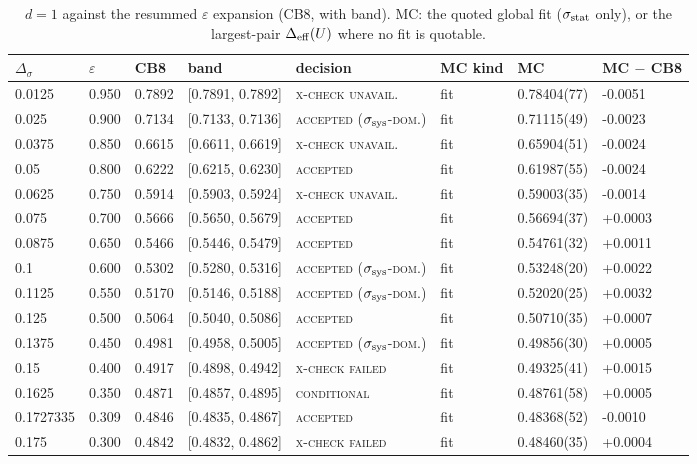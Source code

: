 \documentclass[10pt,a4paper]{article}
\newcommand{\Ds}{\Delta_\sigma}
\newcommand{\Deff}{\Delta_{\rm eff}}
\newcommand{\lbl}[1]{{\mdseries\scshape #1}}
\newcommand{\sstat}{\sigma_{\rm stat}}
\begin{document}
\begin{table}[htbp]\centering\scriptsize
\caption{$d=1$ against the resummed $\varepsilon$ expansion (CB8, with band). MC: the quoted global fit ($\sstat$ only), or the largest-pair
$\Deff(U)$ where no fit is quotable.}\label{tab:theory1d}
\begin{tabular}{@{}llllllll@{}}\toprule
$\Ds$ & $\varepsilon$ & CB8 & band & decision & MC kind & MC & MC $-$ CB8 \\\midrule
0.0125 & 0.950 & 0.7892 & [0.7891, 0.7892] & \lbl{x-check unavail.} & fit & 0.78404(77) & -0.0051 \\
0.025 & 0.900 & 0.7134 & [0.7133, 0.7136] & \lbl{accepted ($\sigma_{\rm sys}$-dom.)} & fit & 0.71115(49) & -0.0023 \\
0.0375 & 0.850 & 0.6615 & [0.6611, 0.6619] & \lbl{x-check unavail.} & fit & 0.65904(51) & -0.0024 \\
0.05 & 0.800 & 0.6222 & [0.6215, 0.6230] & \lbl{accepted} & fit & 0.61987(55) & -0.0024 \\
0.0625 & 0.750 & 0.5914 & [0.5903, 0.5924] & \lbl{x-check unavail.} & fit & 0.59003(35) & -0.0014 \\
0.075 & 0.700 & 0.5666 & [0.5650, 0.5679] & \lbl{accepted} & fit & 0.56694(37) & +0.0003 \\
0.0875 & 0.650 & 0.5466 & [0.5446, 0.5479] & \lbl{accepted} & fit & 0.54761(32) & +0.0011 \\
0.1 & 0.600 & 0.5302 & [0.5280, 0.5316] & \lbl{accepted ($\sigma_{\rm sys}$-dom.)} & fit & 0.53248(20) & +0.0022 \\
0.1125 & 0.550 & 0.5170 & [0.5146, 0.5188] & \lbl{accepted ($\sigma_{\rm sys}$-dom.)} & fit & 0.52020(25) & +0.0032 \\
0.125 & 0.500 & 0.5064 & [0.5040, 0.5086] & \lbl{accepted} & fit & 0.50710(35) & +0.0007 \\
0.1375 & 0.450 & 0.4981 & [0.4958, 0.5005] & \lbl{accepted ($\sigma_{\rm sys}$-dom.)} & fit & 0.49856(30) & +0.0005 \\
0.15 & 0.400 & 0.4917 & [0.4898, 0.4942] & \lbl{x-check failed} & fit & 0.49325(41) & +0.0015 \\
0.1625 & 0.350 & 0.4871 & [0.4857, 0.4895] & \lbl{conditional} & fit & 0.48761(58) & +0.0005 \\
0.1727335 & 0.309 & 0.4846 & [0.4835, 0.4867] & \lbl{accepted} & fit & 0.48368(52) & -0.0010 \\
0.175 & 0.300 & 0.4842 & [0.4832, 0.4862] & \lbl{x-check failed} & fit & 0.48460(35) & +0.0004 \\

\end{tabular}
\end{table}
\end{document}

